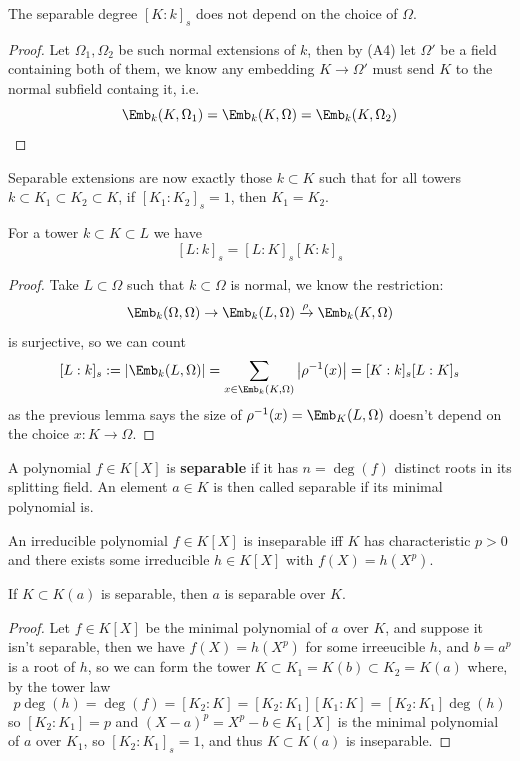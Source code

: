 \documentclass{article}
\begin{document}
\begin{lemma}
    The separable degree $[K:k]_s$ does not depend on the choice of $\Omega$.\begin{proof}
        Let $\Omega_1,\Omega_2$ be such normal extensions of $k$, then by (A4) let $\Omega'$ be a field containing both of them, we know any embedding $K\rightarrow \Omega'$ must send $K$ to the normal subfield containg it, i.e. \[
            \Emb_k(K,\Omega_1) = \Emb_k(K,\Omega) = \Emb_k(K,\Omega_2)\qedhere
        \]
    \end{proof}
\end{lemma}
Separable extensions are now exactly those $k\subset K$ such that for all towers $k\subset K_1\subset K_2\subset K$, if $[K_1:K_2]_s=1$, then $K_1=K_2$.

\begin{proposition}
    For a tower $k\subset K\subset L$ we have \[
    [L:k]_s=[L:K]_s[K:k]_s
    \]
    \begin{proof}
        Take $L\subset \Omega$ such that $k\subset \Omega$ is normal, we know the restriction: \[
        \Emb_k(\Omega,\Omega)\rightarrow\Emb_k(L,\Omega)\xrightarrow{\rho} \Emb_k(K,\Omega)
        \] is surjective, so we can count\[
        [L:k]_s := \abs{\Emb_k(L,\Omega)} = \sum_{x\in\Emb_k(K,\Omega)}\abs{\rho^{-1}(x)} = [K:k]_s[L:K]_s
        \] as the previous lemma says the size of $\rho^{-1}(x) = \Emb_K(L,\Omega)$ doesn't depend on the choice $x:K\rightarrow \Omega$.
    \end{proof}
\end{proposition}

\begin{definition}
    A polynomial $f\in K[X]$ is \textbf{separable} if it has $n=\deg(f)$ distinct roots in its splitting field. An element $a\in K$ is then called separable if its minimal polynomial is.
\end{definition}

\begin{proposition}
    An irreducible polynomial $f\in K[X]$ is inseparable iff $K$ has characteristic $p>0$ and there exists some irreducible $h\in K[X]$ with $f(X)=h(X^p)$.
\end{proposition}

\begin{lemma}
    If $K\subset K(a)$ is separable, then $a$ is separable over $K$.
    \begin{proof}
        Let $f\in K[X]$ be the minimal polynomial of $a$ over $K$, and suppose it isn't separable, then we have $f(X) = h(X^p)$ for some irreeucible $h$, and $b=a^p$ is a root of $h$, so we can form the tower $K\subset K_1 = K(b) \subset K_2 = K(a)$ where, by the tower law \[
        p \deg(h) = \deg(f) = [K_2:K] = [K_2:K_1][K_1:K] = [K_2:K_1]\deg(h)
        \] so $[K_2:K_1] = p$ and $(X-a)^p = X^p-b\in K_1[X]$ is the minimal polynomial of $a$ over $K_1$, so $[K_2:K_1]_s = 1$, and thus $K\subset K(a)$ is inseparable.
    \end{proof}
\end{lemma}
\end{document}
